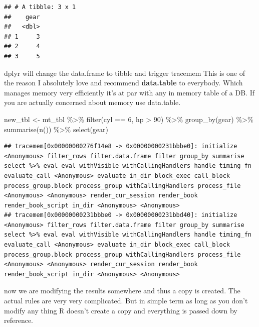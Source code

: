 \documentclass[
]{book}
\newenvironment{Shaded}{\begin{snugshade}}{\end{snugshade}}
\newcommand{\DecValTok}[1]{\textcolor[rgb]{0.00,0.00,0.81}{#1}}
\newcommand{\FunctionTok}[1]{\textcolor[rgb]{0.00,0.00,0.00}{#1}}
\newcommand{\NormalTok}[1]{#1}
\newcommand{\OtherTok}[1]{\textcolor[rgb]{0.56,0.35,0.01}{#1}}
\newcommand{\SpecialCharTok}[1]{\textcolor[rgb]{0.00,0.00,0.00}{#1}}
\begin{document}
\begin{verbatim}
## # A tibble: 3 x 1
##    gear
##   <dbl>
## 1     3
## 2     4
## 3     5
\end{verbatim}

dplyr will change the data.frame to tibble and trigger tracemem This is one of the reason I absolutely love and recommend \textbf{data.table} to everybody. Which manages memory very efficiently it's at par with any in memory table of a DB. If you are actually concerned about memory use data.table.

\begin{Shaded}
\begin{Highlighting}[]
\NormalTok{new\_tbl }\OtherTok{\textless{}{-}}\NormalTok{ mt\_tbl }\SpecialCharTok{\%\textgreater{}\%}
  \FunctionTok{filter}\NormalTok{(cyl }\SpecialCharTok{==} \DecValTok{6}\NormalTok{,}
\NormalTok{         hp }\SpecialCharTok{\textgreater{}} \DecValTok{90}\NormalTok{) }\SpecialCharTok{\%\textgreater{}\%}
  \FunctionTok{group\_by}\NormalTok{(gear) }\SpecialCharTok{\%\textgreater{}\%}
  \FunctionTok{summarise}\NormalTok{(}\FunctionTok{n}\NormalTok{()) }\SpecialCharTok{\%\textgreater{}\%}
  \FunctionTok{select}\NormalTok{(gear)}
\end{Highlighting}
\end{Shaded}

\begin{verbatim}
## tracemem[0x00000000276f14e8 -> 0x00000000231bbbe0]: initialize <Anonymous> filter_rows filter.data.frame filter group_by summarise select %>% eval eval withVisible withCallingHandlers handle timing_fn evaluate_call <Anonymous> evaluate in_dir block_exec call_block process_group.block process_group withCallingHandlers process_file <Anonymous> <Anonymous> render_cur_session render_book render_book_script in_dir <Anonymous> <Anonymous> 
## tracemem[0x00000000231bbbe0 -> 0x00000000231bbd40]: initialize <Anonymous> filter_rows filter.data.frame filter group_by summarise select %>% eval eval withVisible withCallingHandlers handle timing_fn evaluate_call <Anonymous> evaluate in_dir block_exec call_block process_group.block process_group withCallingHandlers process_file <Anonymous> <Anonymous> render_cur_session render_book render_book_script in_dir <Anonymous> <Anonymous>
\end{verbatim}

now we are modifying the results somewhere and thus a copy is created. The actual rules are very very complicated. But in simple term as long as you don't modify any thing R doesn't create a copy and everything is passed down by reference.
\end{document}
